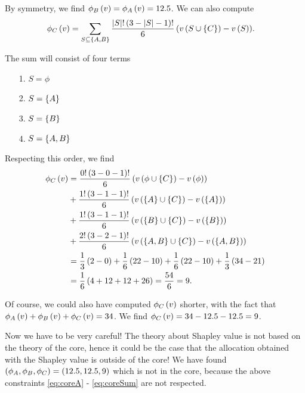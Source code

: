 \begin{enumerate} [label=\alph*.]
	By symmetry, we find $\phi_{B} \left(v\right) = \phi_{A} \left(v\right) = 12.5$. We can also compute
	\begin{align*}
	    \phi_{C} \left(v\right)
	    &= \sum_{S \subseteq \left\{A, B\right\}}{\dfrac{\left\lvert S\right\rvert! \left(3 - \left\lvert S\right\rvert - 1\right)!}{6} \left(v \left(S \cup \left\{C\right\}\right) - v \left(S\right)\right)}.
	\end{align*}
	
	The sum will consist of four terms
	\begin{enumerate}
	    \item[1.] $S = \phi$
	    \item[2.] $S = \left\{A\right\}$
	    \item[3.] $S = \left\{B\right\}$
	    \item[4.] $S = \left\{A, B\right\}$
	\end{enumerate}
	
	Respecting this order, we find
	\begin{align*}
	    \phi_{C} \left(v\right)
	    &= \dfrac{0! \left(3 - 0 - 1\right)!}{6} \left(v \left(\phi \cup \left\{C\right\}\right) - v \left(\phi\right)\right) \\
	    &+ \dfrac{1! \left(3 - 1 - 1\right)!}{6} \left(v \left(\left\{A\right\} \cup \left\{C\right\}\right) - v \left(\left\{A\right\}\right)\right) \\
	    &+ \dfrac{1! \left(3 - 1 - 1\right)!}{6} \left(v \left(\left\{B\right\} \cup \left\{C\right\}\right) - v \left(\left\{B\right\}\right)\right) \\
	    &+ \dfrac{2! \left(3 - 2 - 1\right)!}{6} \left(v \left(\left\{A, B\right\} \cup \left\{C\right\}\right) - v \left(\left\{A, B\right\}\right)\right) \\
	    &= \dfrac{1}{3} \left(2 - 0\right)
	    + \dfrac{1}{6} \left(22 - 10\right)
	    + \dfrac{1}{6} \left(22 - 10\right)
	    + \dfrac{1}{3} \left(34 - 21\right) \\
	    &= \dfrac{1}{6} \left(4 + 12 + 12 + 26\right)
	    = \dfrac{54}{6}
	    = 9.
	\end{align*}
	
	Of course, we could also have computed $\phi_{C} \left(v\right)$ shorter, with the fact that $\phi_{A} \left(v\right) + \phi_{B} \left(v\right) + \phi_{C} \left(v\right) = 34$. We find $\phi_{C} \left(v\right) = 34 - 12.5 - 12.5 = 9$.  
	
	
	\vspace{5mm}
	
	Now we have to be very careful! The theory about Shapley value is not based on the theory of the core, hence it could be the case that the allocation obtained with the Shapley value is outside of the core! We have found $\left(\phi_{A}, \phi_{B}, \phi_{C}\right) = \left(12.5, 12.5, 9\right)$ which is not in the core, because the above constraints \eqref{eq:coreA} - \eqref{eq:coreSum} are not respected. 
	
\end{enumerate}